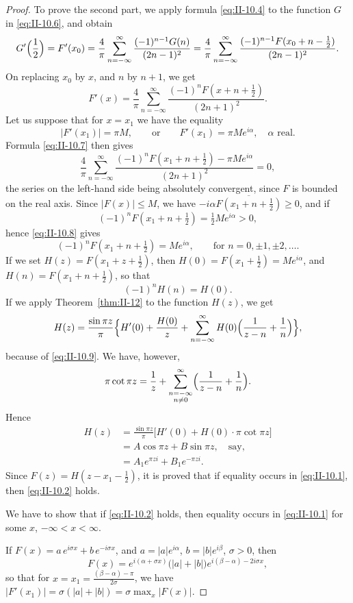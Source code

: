 \begin{proof}
To prove the second part, we apply formula \eqref{eq:II-10.4} to the function $G$ in \eqref{eq:II-10.6}, and obtain
\[
G'\Bigl(\frac{1}{2}\Bigr)=F'(x_{0})
=\frac{4}{\pi}\sum_{n=-\infty}^{\infty}\frac{(-1)^{n-1}G(n)}{(2n-1)^{2}}
=\frac{4}{\pi}\sum_{n=-\infty}^{\infty}\frac{(-1)^{n-1}F(x_{0}+n-\frac{1}{2})}{(2n-1)^{2}}.
\]
On replacing $x_{0}$ by $x$, and $n$ by $n+1$, we get
\begin{equation}\tag{10.7}\label{eq:II-10.7}
F'(x)=\frac{4}{\pi}\sum_{n=-\infty}^{\infty}\frac{(-1)^{n}F(x+n+\frac{1}{2})}{(2n+1)^{2}}.
\end{equation}
Let us suppose that for $x=x_{1}$ we have the equality
\[
|F'(x_{1})|=\pi M,\qquad\text{or}\qquad F'(x_{1})=\pi M e^{i\alpha},\quad\alpha\text{ real}.
\]
Formula \eqref{eq:II-10.7} then gives
\begin{equation}\tag{10.8}\label{eq:II-10.8}
\frac{4}{\pi}\sum_{n=-\infty}^{\infty}\frac{(-1)^{n}F(x_{1}+n+\frac{1}{2})-\pi M e^{i\alpha}}{(2n+1)^{2}}=0,
\end{equation}
the series on the left-hand side being absolutely convergent, since $F$ is bounded on the real axis. Since $|F(x)|\le M$, we have $-i\alpha\overline{F(x_{1}+n+\frac{1}{2})}\ge 0$, and if
\[
(-1)^{n}F(x_{1}+n+\tfrac{1}{2})=\tfrac{1}{2}M e^{i\alpha}>0,
\]
hence \eqref{eq:II-10.8} gives
\[
(-1)^{n}F(x_{1}+n+\tfrac{1}{2})=M e^{i\alpha},\qquad\text{for }n=0,\pm1,\pm2,\dots.
\]
If we set $H(z)=F(x_{1}+z+\frac{1}{2})$, then $H(0)=F(x_{1}+\frac{1}{2})=M e^{i\alpha}$, and $H(n)=F(x_{1}+n+\frac{1}{2})$, so that
\begin{equation}\tag{10.9}\label{eq:II-10.9}
(-1)^{n}H(n)=H(0).
\end{equation}
If we apply Theorem~\ref{thm:II-12} to the function $H(z)$, we get
\[
H(z)=\frac{\sin\pi z}{\pi}\Bigl\{H'(0)+\frac{H(0)}{z}
+\sum_{n=-\infty}^{\infty}H(0)\Bigl(\frac{1}{z-n}+\frac{1}{n}\Bigr)\Bigr\},
\]
because of \eqref{eq:II-10.9}. We have, however,
\[
\pi\cot\pi z=\frac{1}{z}+\sum_{\substack{n=-\infty\\ n\neq 0}}^{\infty}\Bigl(\frac{1}{z-n}+\frac{1}{n}\Bigr).
\]
Hence
\[
\begin{aligned}
H(z) &= \frac{\sin\pi z}{\pi}\bigl[H'(0)+H(0)\cdot\pi\cot\pi z\bigr]\\
&= A\cos\pi z+B\sin\pi z,\quad\text{say},\\
&= A_{1}e^{\pi z i}+B_{1}e^{-\pi z i}.
\end{aligned}
\]
Since $F(z)=H(z-x_{1}-\frac{1}{2})$, it is proved that if equality occurs in \eqref{eq:II-10.1}, then \eqref{eq:II-10.2} holds.

We have to show that if \eqref{eq:II-10.2} holds, then equality occurs in \eqref{eq:II-10.1} for some $x$, $-\infty<x<\infty$.

If $F(x)=a\,e^{i\sigma x}+b\,e^{-i\sigma x}$, and $a=|a|e^{i\alpha}$, $b=|b|e^{i\beta}$, $\sigma>0$, then
\[
F(x)=e^{i(\alpha+\sigma x)}\bigl(|a|+|b|\bigr)e^{i(\beta-\alpha)-2i\sigma x},
\]
so that for $x=x_{1}=\frac{(\beta-\alpha)-\pi}{2\sigma}$, we have $|F'(x_{1})|=\sigma(|a|+|b|)=\sigma\max_{x}|F(x)|$.
\end{proof}


